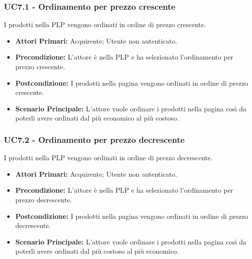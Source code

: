 \subsubsection{UC7.1 - Ordinamento per prezzo crescente} \label{UC7.1}
I prodotti nella PLP vengono ordinati in ordine di prezzo crescente.
\begin{itemize}
    \item \textbf{Attori Primari:} Acquirente; Utente non autenticato.
    \item \textbf{Precondizione:} L'attore è nella PLP e ha selezionato l'ordinamento per prezzo crescente.
    \item \textbf{Postcondizione:} I prodotti nella pagina vengono ordinati in ordine di prezzo crescente.
    \item \textbf{Scenario Principale:} L'attore vuole ordinare i prodotti nella pagina così da poterli avere ordinati dal più economico al più costoso.
\end{itemize}

\subsubsection{UC7.2 - Ordinamento per prezzo decrescente} \label{UC7.2}
I prodotti nella PLP vengono ordinati in ordine di prezzo decrescente.
\begin{itemize}
    \item \textbf{Attori Primari:} Acquirente; Utente non autenticato.
    \item \textbf{Precondizione:} L'attore è nella PLP e ha selezionato l'ordinamento per prezzo decrescente.
    \item \textbf{Postcondizione:} I prodotti nella pagina vengono ordinati in ordine di prezzo decrescente.
    \item \textbf{Scenario Principale:} L'attore vuole ordinare i prodotti nella pagina così da poterli avere ordinati dal più costoso al più economico.
\end{itemize}


